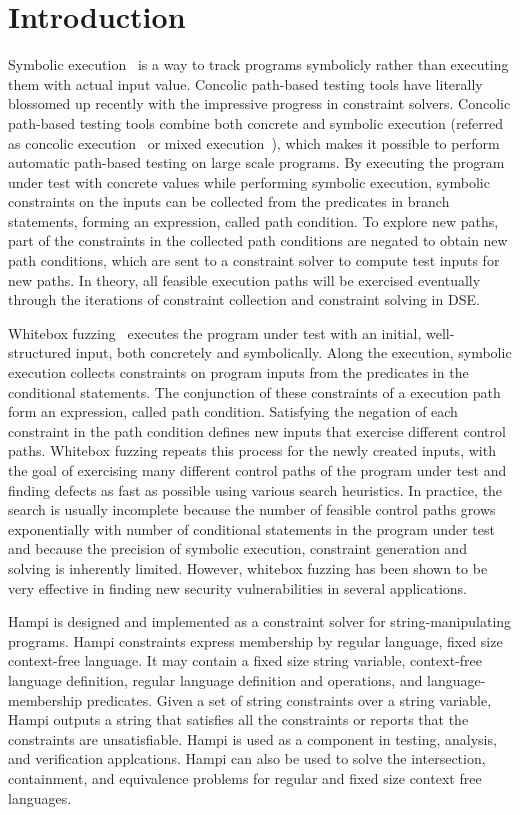 \section{Introduction} 
Symbolic execution~\cite{symbolic} is a way to track programs symbolicly rather than executing them with actual input value. Concolic path-based testing tools have literally blossomed up recently \cite{extenjpf,structural,mixed,exe,fuzz,pex} with the impressive progress in constraint solvers. Concolic path-based testing tools combine both concrete and symbolic execution (referred as concolic execution~\cite{dart,cute} or mixed execution~\cite{mixed}), which makes it possible to perform automatic path-based testing on large scale programs. By executing the program under test with concrete values while performing symbolic execution, symbolic constraints on the inputs can be collected from the predicates in branch statements, forming an expression, called path condition. To explore new paths, part of the constraints in the collected path conditions are negated to obtain new path conditions, which are sent to a constraint solver to compute test inputs for new paths. In theory, all feasible execution paths will be exercised eventually through the iterations of constraint collection and constraint solving in DSE.

Whitebox fuzzing~\cite{fuzzing} executes the program under test with an initial, well-structured input, both concretely and symbolically. Along the execution, symbolic execution collects constraints on program inputs from the predicates in the conditional statements. The conjunction of these constraints of a execution path form an expression, called path condition. Satisfying the negation of each constraint in the path condition defines new inputs that exercise different control paths. Whitebox fuzzing repeats this process for the newly created inputs, with the goal of exercising many different control paths of the program under test and finding defects as fast as possible using various search heuristics. In practice, the search is usually incomplete because the number of feasible control paths grows exponentially with number of conditional statements in the program under test and because the precision of symbolic execution, constraint generation and solving is inherently limited. However, whitebox fuzzing has been shown to be very effective in finding new security vulnerabilities in several applications.

Hampi \cite{hampi} is designed and implemented as a constraint solver for string-manipulating programs. Hampi constraints express membership by regular language, fixed size context-free language. It may contain a fixed size string variable, context-free language definition, regular language definition and operations, and language-membership predicates. Given a set of string constraints over a string variable, Hampi outputs a string that satisfies all the constraints or reports that the constraints are unsatisfiable. Hampi is used as a component in testing, analysis, and verification applcations. Hampi can also be used to solve the intersection, containment, and equivalence problems for regular and fixed size context free languages.